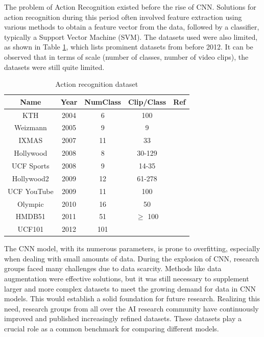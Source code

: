 \documentclass[conference]{IEEEtran}
\begin{document}
The problem of Action Recognition existed before the rise of CNN. Solutions for action recognition during this period often involved feature extraction using various methods to obtain a feature vector from the data, followed by a classifier, typically a Support Vector Machine (SVM). The datasets used were also limited, as shown in Table \ref{config}, which lists prominent datasets from before 2012. It can be observed that in terms of scale (number of classes, number of video clips), the datasets were still quite limited.

\begin{table}[!htbp]
	\centering
	\caption{Action recognition dataset}
	\begin{tabular}{c|c c c c}
		\toprule
		Name & Year & NumClass & Clip/Class & Ref \\
		\midrule
		KTH & 2004 & 6 & 100 & \cite{KTH} \\
		Weizmann & 2005 & 9 & 9 & \cite{Weizmann} \\
		IXMAS & 2007 & 11 & 33 & \cite{IXMAS} \\
		Hollywood & 2008 & 8 & 30-129 & \cite{HollyWood} \\
		UCF Sports & 2008 & 9 & 14-35 & \cite{UCFSports} \\
		Hollywood2 & 2009 & 12 & 61-278 & \cite{Hollywood2} \\
		UCF YouTube & 2009 & 11 & 100 & \cite{UCFYouTube} \\
		Olympic & 2010 & 16 & 50 & \cite{Olympic} \\
		HMDB51 & 2011 & 51 & $\geq$ 100 & \cite{HMDB51} \\
		UCF101 & 2012 & 101 & & \cite{UCF101} \\
		\bottomrule
	\end{tabular}%
	\label{config}
\end{table}%

The CNN model, with its numerous parameters, is prone to overfitting, especially when dealing with small amounts of data. During the explosion of CNN, research groups faced many challenges due to data scarcity. Methods like data augmentation were effective solutions, but it was still necessary to supplement larger and more complex datasets to meet the growing demand for data in CNN models. This would establish a solid foundation for future research. Realizing this need, research groups from all over the AI research community have continuously improved and published increasingly refined datasets. These datasets play a crucial role as a common benchmark for comparing different models.




\end{document}
